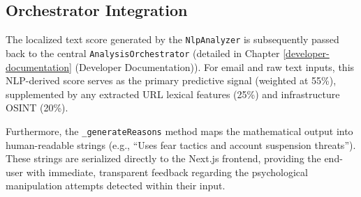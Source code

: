 \subsection{Orchestrator
Integration}\label{orchestrator-integration}

The localized text score generated by the \texttt{NlpAnalyzer} is
subsequently passed back to the central \texttt{AnalysisOrchestrator}
(detailed in Chapter \ref{developer-documentation} (Developer Documentation)). For email and raw text inputs, this NLP-derived
score serves as the primary predictive signal (weighted at 55\%),
supplemented by any extracted URL lexical features (25\%) and
infrastructure OSINT (20\%).

Furthermore, the \texttt{\_generateReasons} method maps the mathematical
output into human-readable strings (e.g., ``Uses fear tactics and
account suspension threats''). These strings are serialized directly to
the Next.js frontend, providing the end-user with immediate, transparent
feedback regarding the psychological manipulation attempts detected
within their input.


